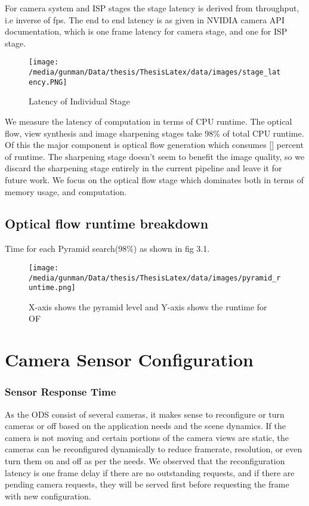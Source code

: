 For camera system and ISP stages the stage latency is derived from throughput, i.e inverse of fps. The end to end latency is as given in NVIDIA camera API documentation, which is one frame latency for camera stage, and one for ISP stage.

\begin{figure}[h]
	\begin{center}
		\texttt{[image: /media/gunman/Data/thesis/ThesisLatex/data/images/stage\_latency.PNG]}
		\caption{Latency of Individual Stage}
		\label{fig:ex_4_9}
	\end{center}
	\vspace{-0.3in}
\end{figure} 

We measure the latency of computation in terms of CPU runtime. The optical flow, view synthesis and image sharpening stages take 98\% of total CPU runtime. Of this the major component is optical flow generation which consumes [] percent of runtime. The sharpening stage doesn't seem to benefit the image quality, so we discard the sharpening stage entirely in the current pipeline and leave it for future work. We focus on the optical flow stage which dominates both in terms of memory usage, and computation. 


\subsection{Optical flow runtime breakdown}
Time for each Pyramid search(98\%) as shown in fig 3.1.
\begin{figure}[h]
	\begin{center}
		\texttt{[image: /media/gunman/Data/thesis/ThesisLatex/data/images/pyramid\_runtime.png]}
		\caption{X-axis shows the pyramid level and Y-axis shows the runtime for OF}
		\label{fig:ex_4_9}
	\end{center}
	\vspace{-0.3in}
\end{figure} 

\section{Camera Sensor Configuration}
\subsubsection{Sensor Response Time}
As the ODS consist of several cameras, it makes sense to reconfigure or turn cameras or off based on the application needs and the scene dynamics. If the camera is not moving and certain portions of the camera views are static, the cameras can be reconfigured dynamically to reduce framerate, resolution, or even turn them on and off as per the needs. We observed that the reconfiguration latency is one frame delay if there are no outstanding requests, and if there are pending camera requests, they will be served first before requesting the frame with new configuration. 

